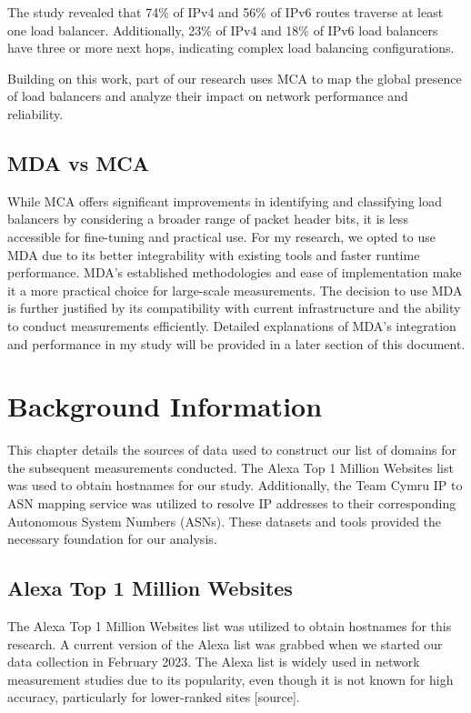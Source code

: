 \documentclass[12pt]{cwru_thesis}
\begin{document}
The study revealed that 74\% of IPv4 and 56\% of IPv6 routes traverse at least one load balancer. Additionally, 23\% of IPv4 and 18\% of IPv6 load balancers have three or more next hops, indicating complex load balancing configurations.

Building on this work, part of our research uses MCA to map the global presence of load balancers and analyze their impact on network performance and reliability. 

\section{MDA vs MCA}
While MCA offers significant improvements in identifying and classifying load balancers by considering a broader range of packet header bits, it is less accessible for fine-tuning and practical use. For my research, we opted to use MDA due to its better integrability with existing tools and faster runtime performance. MDA's established methodologies and ease of implementation make it a more practical choice for large-scale measurements. The decision to use MDA is further justified by its compatibility with current infrastructure and the ability to conduct measurements efficiently. Detailed explanations of MDA's integration and performance in my study will be provided in a later section of this document.



\chapter{Background Information }

This chapter details the sources of data used to construct our list of domains for the subsequent measurements conducted. The Alexa Top 1 Million Websites list was used to obtain hostnames for our study.
Additionally, the Team Cymru IP to ASN mapping service was utilized to resolve IP addresses to their corresponding Autonomous System Numbers (ASNs). These datasets and tools provided the necessary foundation for our analysis.

\section{Alexa Top 1 Million Websites}

The Alexa Top 1 Million Websites list was utilized to obtain hostnames for this research. A current version of the Alexa list was grabbed when we started our data collection in February 2023. The Alexa list is widely used in network measurement studies due to its popularity, even though it is not known for high accuracy, particularly for lower-ranked sites [source].
\end{document}
